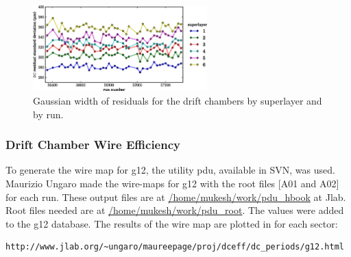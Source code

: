 \begin{figure}\begin{center}
\includegraphics[width=0.6\textwidth]{figures/calib/dc/dc_resid_sigma.eps}
\caption[DC Residuals (Width)]{\label{fig:calib.dc.residuals.wid}Gaussian width of residuals for the drift chambers by superlayer and by run.}
\end{center}\end{figure}

\subsubsection{\label{sec:calib.dc.eff}Drift Chamber Wire Efficiency}

To generate the wire map for g12, the utility pdu, available in SVN, was used. Maurizio Ungaro made the wire-maps for g12 with the root files [A01 and A02] for each run. These output files are at \url{/home/mukesh/work/pdu_hbook} at Jlab. Root files needed are at \url{/home/mukesh/work/pdu_root}. The values were added to the g12 database. The results of the wire map are plotted in for each sector:

\begin{verbatim}
http://www.jlab.org/~ungaro/maureepage/proj/dceff/dc_periods/g12.html
\end{verbatim}

\FloatBarrier
